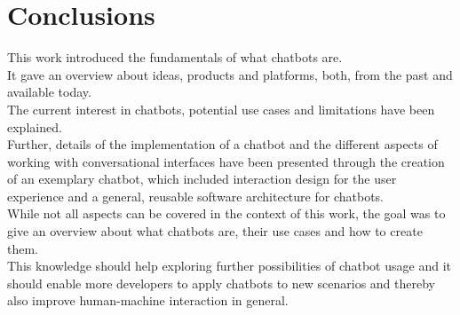 \chapter{Conclusions}

This work introduced the fundamentals of what chatbots are.
\\
It gave an overview about ideas, products and platforms, both, from the past and available today.
\\
The current interest in chatbots, potential use cases and limitations have been explained.
\\
Further, details of the implementation of a chatbot and the different aspects of working with conversational interfaces
have been presented through the creation of an exemplary chatbot,
which included interaction design for the user experience and a general, reusable software architecture for chatbots.
\\

While not all aspects can be covered in the context of this work,
the goal was to give an overview about what chatbots are, their use cases and how to create them.
\\

This knowledge should help exploring further possibilities of chatbot usage
and it should enable more developers to apply chatbots to new scenarios and thereby also improve human-machine interaction in general.
